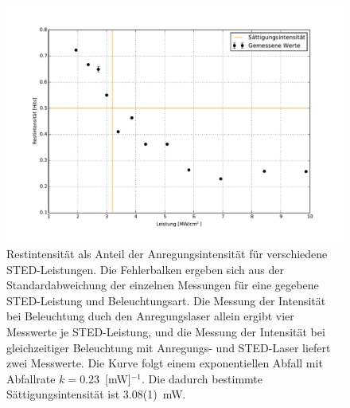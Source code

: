\begin{figure}
	\centering
	\includegraphics[width=\textwidth]{plots/depletion.pdf}
	\caption{Restintensität als Anteil der Anregungsintensität für verschiedene STED-Leistungen. 
		Die Fehlerbalken ergeben sich aus der Standardabweichung der einzelnen Messungen für eine gegebene STED-Leistung und Beleuchtungsart. 
		Die Messung der Intensität bei Beleuchtung duch den Anregungslaser allein ergibt vier Messwerte je STED-Leistung, und die Messung der Intensität bei gleichzeitiger Beleuchtung mit Anregungs- und STED-Laser liefert zwei Messwerte.
	Die Kurve folgt einem exponentiellen Abfall mit Abfallrate $k=0.23$~[mW]$^{-1}$. 
Die dadurch bestimmte Sättigungsintensität ist 3.08(1)~mW.}\label{fig:depletion}
\end{figure}



